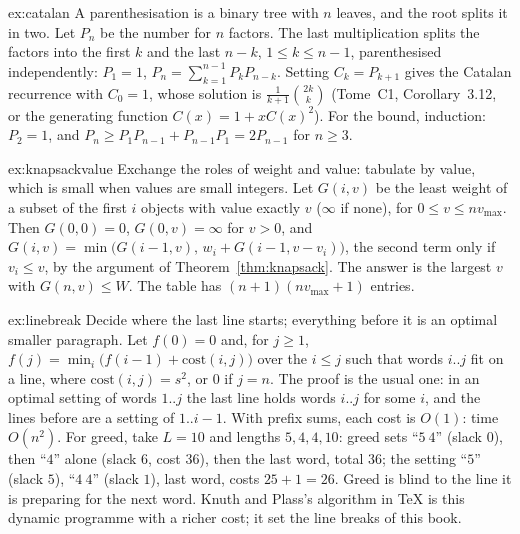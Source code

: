 \begin{solution}{ex:catalan}
\idea A parenthesisation is a binary tree with $n$ leaves, and the root splits it in two.
\writeup Let $P_n$ be the number for $n$ factors. The last multiplication splits the factors into the first $k$ and the last $n-k$, $1\le k\le n-1$, parenthesised independently: $P_1=1$, $P_n=\sum_{k=1}^{n-1}P_kP_{n-k}$. Setting $C_{k}=P_{k+1}$ gives
the Catalan recurrence with $C_0=1$, whose solution is $\frac1{k+1}\binom{2k}k$ (Tome~C1, Corollary~3.12, or the generating function $C(x)=1+xC(x)^2$). For the bound, induction: $P_2=1$, and $P_n\ge P_1P_{n-1}+P_{n-1}P_1=2P_{n-1}$ for $n\ge3$.
\end{solution}

\begin{solution}{ex:knapsackvalue}
\idea Exchange the roles of weight and value: tabulate by value, which is small when values are small integers.
\writeup Let $G(i,v)$ be the least weight of a subset of the first $i$ objects with value exactly $v$ ($\infty$ if none), for $0\le v\le nv_{\max}$. Then $G(0,0)=0$, $G(0,v)=\infty$ for $v>0$, and $G(i,v)=\min\big(G(i-1,v),\,w_i+G(i-1,v-v_i)\big)$, the second term only if $v_i\le v$,
by the argument of Theorem~\ref{thm:knapsack}. The answer is the largest $v$ with $G(n,v)\le W$. The table has $(n+1)(nv_{\max}+1)$ entries.
\end{solution}

\begin{solution}{ex:linebreak}
\idea Decide where the last line starts; everything before it is an optimal smaller paragraph.
\writeup Let $f(0)=0$ and, for $j\ge1$, $f(j)=\min_i\big(f(i-1)+\mathrm{cost}(i,j)\big)$ over the $i\le j$ such that words $i..j$ fit on a line, where $\mathrm{cost}(i,j)=s^2$, or $0$ if $j=n$. The proof is the usual one: in an optimal setting of words $1..j$ the last line holds words $i..j$ for some $i$, and the
lines before are a setting of $1..i-1$. With prefix sums, each cost is $O(1)$: time $O(n^2)$. For greed, take $L=10$ and lengths $5,4,4,10$: greed sets ``$5\ 4$'' (slack $0$), then ``$4$'' alone (slack $6$, cost $36$), then the last word, total $36$;
the setting ``$5$'' (slack $5$), ``$4\ 4$'' (slack $1$), last word, costs $25+1=26$. Greed is blind to the line it is preparing for the next word. Knuth and Plass's algorithm in \TeX{} is this dynamic programme with a richer cost; it set the line breaks of this book.
\end{solution}

